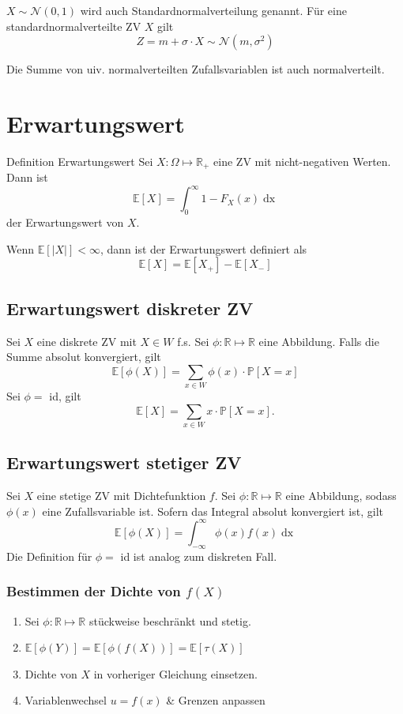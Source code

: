 \documentclass[a4paper,10pt]{article}
\def\R{\mathbb{R}}
\def\P{\mathbb{P}}
\def\E{\mathbb{E}}
\begin{document}
\(X \sim \mathcal{N}(0,1)\) wird auch Standardnormalverteilung genannt. Für eine standardnormalverteilte ZV \(X\) gilt
\[Z = m +\sigma \cdot X \sim \mathcal{N}(m, \sigma^2)\]

Die Summe von uiv. normalverteilten Zufallsvariablen ist auch normalverteilt.

\section{Erwartungswert}
\begin{mainbox}{Definition Erwartungswert}
	Sei \(X: \Omega \mapsto \R_+\) eine ZV mit nicht-negativen Werten. Dann ist
	\[\E[X] = \int_0^\infty 1- F_X(x) \mathop{dx}\]
	der Erwartungswert von \(X\).
\end{mainbox}
Wenn \(\E[|X|] < \infty\), dann ist der Erwartungswert definiert als
\[\E[X] = \E[X_+] - \E[X_-]\]

\subsection{Erwartungswert diskreter ZV}
Sei \(X\) eine diskrete ZV mit \(X \in W\) f.s. Sei \(\phi: \R \mapsto \R\) eine Abbildung. Falls die Summe absolut konvergiert, gilt
\[\E[\phi(X)] = \sum_{x\in W} \phi(x)\cdot \P[X=x]\]
Sei \(\phi = \) id, gilt
\[
	\E[X] = \sum_{x\in W} x \cdot \P[X=x]
	.\]

\subsection{Erwartungswert stetiger ZV}
Sei \(X\) eine stetige ZV mit Dichtefunktion \(f\). Sei \(\phi :\R\mapsto \R\) eine Abbildung, sodass \(\phi(x)\) eine Zufallsvariable ist. Sofern das Integral absolut konvergiert ist, gilt
\[\E[\phi(X)] = \int_{-\infty}^{\infty}\phi(x)f(x) \mathop{dx}\]
Die Definition für \(\phi = \) id ist analog zum diskreten Fall.
\subsubsection{\texorpdfstring{Bestimmen der Dichte von \(f(X)\)}{Bestimmen der Dichte von f(X)}}
\begin{enumerate}
	\item Sei \(\phi: \R \mapsto \R\) stückweise beschränkt und stetig.
	\item \(\E[\phi(Y)] = \E[\phi(f(X))] = \E[\tau(X)]\)
	\item Dichte von \(X\) in vorheriger Gleichung einsetzen.
	\item Variablenwechsel \(u = f(x)\) \& Grenzen anpassen
\end{enumerate}
\end{document}
